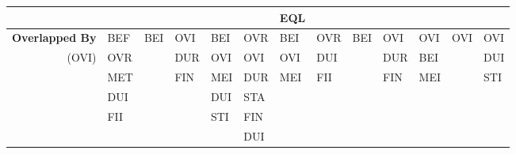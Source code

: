 \documentclass[11pt]{report}
\newenvironment{vvarmargin}[2]
{
  \begin{list}{}
  {
    \setlength{\topsep}{0pt}
    \setlength{\leftmargin}{0pt}
    \setlength{\rightmargin}{0pt}
    \setlength{\listparindent}{\parindent}
    \setlength{\itemindent}{\parindent}
    \setlength{\parsep}{0pt plus 1pt}
    \addtolength{\leftmargin}{#1}\addtolength{\rightmargin}{#2}
  }
  \item
}
{
  \end{list}
}
\begin{document}
\begin{table}[p]
\begin{vvarmargin}{-4cm}{-4cm}
\begin{center}
\begin{tabular}[t]{|r|l|l|l|l|l|l|l|l|l|l|l|l|}
                                          &                         &                         &                         &                         &                         & EQL                     &                         &                         &                         &                         &                         &                         \\
                  \hline
                  \textbf{Overlapped By}  & BEF                     & BEI                     & OVI                     & BEI                     & OVR                     & BEI                     & OVR                     & BEI                     & OVI                     & OVI                     & OVI                     & OVI                     \\
                  (OVI)                   & OVR                     &                         & DUR                     & OVI                     & OVI                     & OVI                     & DUI                     &                         & DUR                     & BEI                     &                         & DUI                     \\
                                          & MET                     &                         & FIN                     & MEI                     & DUR                     & MEI                     & FII                     &                         & FIN                     & MEI                     &                         & STI                     \\
                                          & DUI                     &                         &                         & DUI                     & STA                     &                         &                         &                         &                         &                         &                         &                         \\
                                          & FII                     &                         &                         & STI                     & FIN                     &                         &                         &                         &                         &                         &                         &                         \\
                                          &                         &                         &                         &                         & DUI                     &                         &                         &                         &                         &                         &                         &                         \\

\end{tabular}
\end{center}
\end{vvarmargin}
\end{table}
\end{document}

